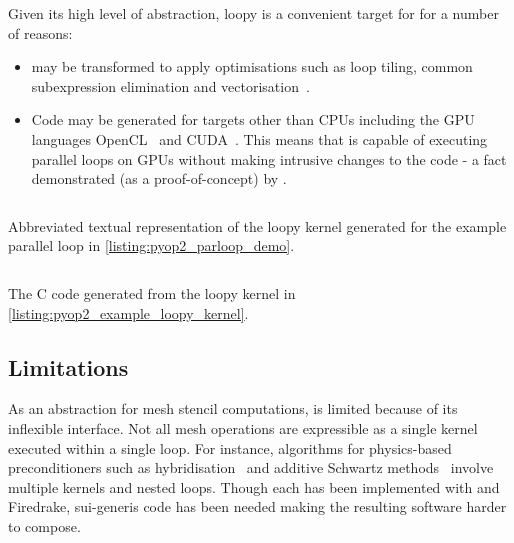 \documentclass[thesis]{subfiles}
\begin{document}
Given its high level of abstraction, loopy is a convenient target for  for a number of reasons:
\begin{itemize}
  \item
     may be transformed to apply optimisations such as loop tiling, common subexpression elimination and vectorisation~\cite{klocknerLooPyFortran2015,klocknerArrayProgramTransformation2016,sunStudyVectorizationMatrixfree2020}.
  \item
    Code may be generated for targets other than CPUs including the GPU languages OpenCL~\cite{stoneOpenCLParallelProgramming2010a} and CUDA~\cite{CUDAProgrammingGuide}.
    This means that  is capable of executing parallel loops on GPUs without making intrusive changes to the code - a fact demonstrated (as a proof-of-concept) by \cite{fenics2021-kulkarni}.
\end{itemize}

\begin{listing}
  \centering
  \begin{minipage}{.9\textwidth}
    \inputminted[linenos]{text}{./scripts/artefacts/pyop2_example_loopy_kernel_tidy.txt}
  \end{minipage}
  \caption{
    Abbreviated textual representation of the loopy kernel generated for the example parallel loop in \cref{listing:pyop2_parloop_demo}.
  }
  \label{listing:pyop2_example_loopy_kernel}
\end{listing}

\begin{listing}
  \centering
  \begin{minipage}{.9\textwidth}
    \inputminted[linenos]{c}{./scripts/artefacts/pyop2_example_c_code_tidy.c}
  \end{minipage}
  \caption{
    The C code generated from the loopy kernel in \cref{listing:pyop2_example_loopy_kernel}.
  }
  \label{listing:pyop2_example_c_code}
\end{listing}

\subsection{Limitations}

As an abstraction for mesh stencil computations,  is limited because of its inflexible interface.
Not all mesh operations are expressible as a single kernel executed within a single loop.
For instance, algorithms for physics-based preconditioners such as hybridisation~\cite{gibsonSlateExtendingFiredrake2020} and additive Schwartz methods~\cite{farrellPCPATCHSoftwareTopological2021} involve multiple kernels and nested loops.
Though each has been implemented with  and Firedrake, sui-generis code has been needed making the resulting software harder to compose.
\end{document}
